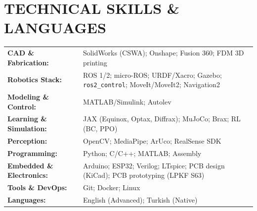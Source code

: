 \section*{TECHNICAL SKILLS \& LANGUAGES}

\begingroup
\renewcommand{\arraystretch}{1.12}
\begin{tabularx}{\textwidth}{@{}lX@{}}
\textbf{CAD \& Fabrication:} & SolidWorks (CSWA); Onshape; Fusion 360; FDM 3D printing \\
\textbf{Robotics Stack:} & ROS 1/2; micro-ROS; URDF/Xacro; Gazebo; \texttt{ros2\_control}; MoveIt/MoveIt2; Navigation2 \\
\textbf{Modeling \& Control:} & MATLAB/Simulink; Autolev \\
\textbf{Learning \& Simulation:} & JAX (Equinox, Optax, Diffrax); MuJoCo; Brax; RL (BC, PPO) \\
\textbf{Perception:} & OpenCV; MediaPipe; ArUco; RealSense SDK \\
\textbf{Programming:} & Python; C/C++; MATLAB; Assembly \\
\textbf{Embedded \& Electronics:} & Arduino; ESP32; Verilog; LTspice; PCB design (KiCad); PCB prototyping (LPKF S63) \\
\textbf{Tools \& DevOps:} & Git; Docker; Linux \\
\textbf{Languages:} & English (Advanced); Turkish (Native) \\
\end{tabularx}
\endgroup
